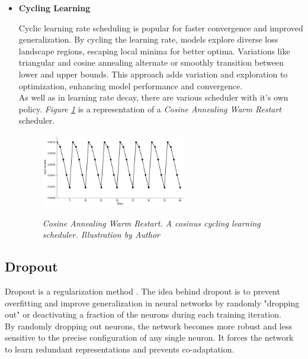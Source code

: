\begin{itemize}
    \newpage

    \item \textbf{Cycling Learning}

    Cyclic learning rate scheduling is popular for
    faster convergence and improved generalization.
    By cycling the learning rate, models explore diverse loss landscape regions, escaping local minima for better optima.
    Variations like triangular and cosine annealing alternate or smoothly transition
    between lower and upper bounds. This approach adds variation and exploration to optimization, enhancing model performance and convergence. \\

    As well as in learning rate decay, there are various scheduler with it's own policy. \textit{Figure \ref{fig:cycling-rate-decay}} is
    a representation of a \textit{Cosine Annealing Warm Restart} scheduler.
    \begin{figure}[H]
    \centering
    \includegraphics[width=0.6\textwidth]{imatges/preliminaries/CosineAnnealingWarmRestarts-scheduler.png}
    \caption[Cosine Annealing Warm Restart]{\textit{Cosine Annealing Warm Restart. A cosinus cycling learning scheduler.
   Illustration by Author}}
    {\label{fig:cycling-rate-decay}}
    \end{figure}
\end{itemize}

\newpage

\subsection{Dropout}

Dropout is a regularization method \cite{DropoutPaper}. The idea behind dropout is to prevent overfitting and improve generalization in neural networks by randomly "dropping out" or deactivating a fraction of the neurons during each training iteration. \\

By randomly dropping out neurons, the network becomes more robust and less sensitive to the precise configuration of any single neuron. It forces the network to learn redundant representations and prevents co-adaptation.

